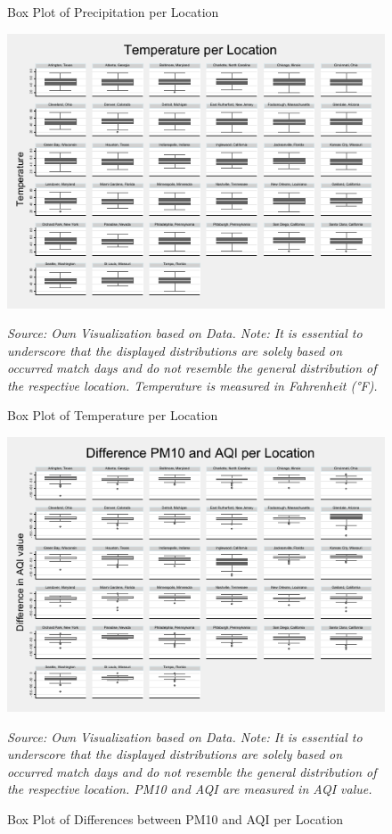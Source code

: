 \documentclass[12pt,a4paper]{article}
\begin{document}
{\begin{figure}
	\caption{Box Plot of Precipitation per Location}
	\label{AppF:2}
\end{figure}
\vfill
\clearpage
\vfill
\begin{figure}
	\center
	\includegraphics[scale=1.7]{../05_Figures/Temperature_per_Place.pdf}
	\caption*{\footnotesize \textit{Source: Own Visualization based on \citeauthor{PRISM} Data. Note: It is essential to underscore that the displayed distributions are solely based on occurred match days and do not resemble the general distribution of the respective location. Temperature is measured in Fahrenheit (°F).}}
	\caption{Box Plot of Temperature per Location}
	\label{AppF:3}
\end{figure}
\vfill
\clearpage
\vfill
\begin{figure}[h]
	\center
	\includegraphics[scale=1.7]{../05_Figures/Difference_per_Place.pdf}
	\caption*{\footnotesize \textit{Source: Own Visualization based on \citeauthor{EPA} Data. Note: It is essential to underscore that the displayed distributions are solely based on occurred match days and do not resemble the general distribution of the respective location. PM10 and AQI are measured in AQI value.}}
	\caption{Box Plot of Differences between PM10 and AQI per Location}
	\label{AppF:4}
\end{figure}

}
\end{document}
